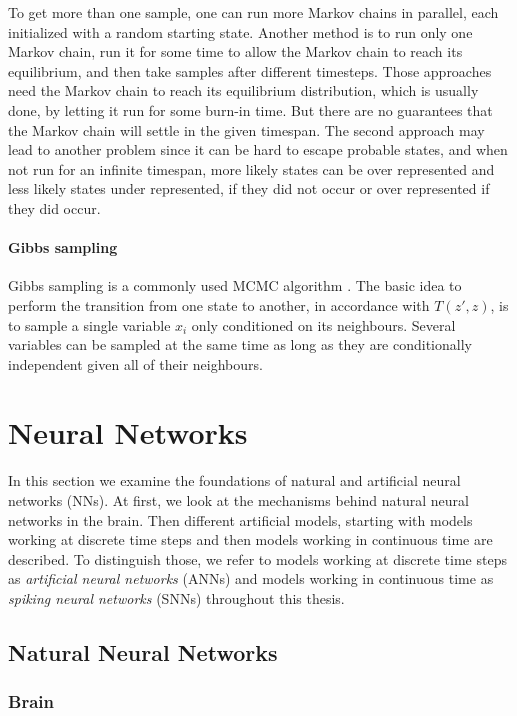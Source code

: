 To get more than one sample, one can run more Markov chains in parallel, each initialized with a random starting state. 
Another method is to run only one Markov chain, run it for some time to allow the Markov chain to reach its equilibrium, and then take samples after different timesteps.
Those approaches need the Markov chain to reach its equilibrium distribution, which is usually done, by letting it run for some burn-in time.
But there are no guarantees that the Markov chain will settle in the given timespan.    
The second approach may lead to another problem since it can be hard to escape probable states, and when not run for an infinite timespan, more likely states can be over represented and less likely states under represented, if they did not occur or over represented if they did occur.  

\paragraph{Gibbs sampling} Gibbs sampling is a commonly used MCMC algorithm \cite{Goodfellow-et-al-2016-Book}. The basic idea to perform the transition from one state to another, in accordance with $T(z',z)$, is to sample a single variable $x_i$ only conditioned on its neighbours. 
Several variables can be sampled at the same time as long as they are conditionally independent given all of their neighbours.

\section{Neural Networks} \label{c:NNs}

In this section we examine the foundations of natural and artificial neural networks (NNs).
At first, we look at the mechanisms behind natural neural networks in the brain.
Then different artificial models, starting with models working at discrete time steps and then models working in continuous time are described.
To distinguish those, we refer to models working at discrete time steps as \textit{artificial neural networks} (ANNs) and models working in continuous time as \textit{spiking neural networks} (SNNs) throughout this thesis.

\subsection{Natural Neural Networks} \label{c:natural}
\subsubsection{Brain} \label{c:brain}

